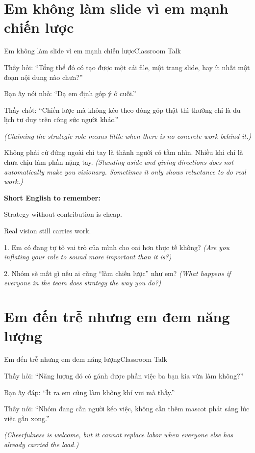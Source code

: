 \section{Em không làm slide vì em mạnh chiến lược}
\begin{truyen}{Em không làm slide vì em mạnh chiến lược}{Classroom Talk}

Thầy hỏi: ``Tổng thể đó có tạo được một cái file, một trang slide, hay ít nhất một đoạn nội dung nào chưa?''

Bạn ấy nói nhỏ: ``Dạ em định góp ý ở cuối.''

Thầy chốt: ``Chiến lược mà không kéo theo đóng góp thật thì thường chỉ là du lịch tư duy trên công sức người khác.''

\textit{(Claiming the strategic role means little when there is no concrete work behind it.)}
\end{truyen}

\begin{baihoc}
Không phải cứ đứng ngoài chỉ tay là thành người có tầm nhìn. Nhiều khi chỉ là chưa chịu làm phần nặng tay.
\textit{(Standing aside and giving directions does not automatically make you visionary. Sometimes it only shows reluctance to do real work.)}
\end{baihoc}

\begin{ghinhoanh}
\textbf{Short English to remember:}

Strategy without contribution is cheap.

Real vision still carries work.
\end{ghinhoanh}

\begin{tuhocnhanh}
1. Em có đang tự tô vai trò của mình cho oai hơn thực tế không? \textit{(Are you inflating your role to sound more important than it is?)}

2. Nhóm sẽ mất gì nếu ai cũng “làm chiến lược” như em? \textit{(What happens if everyone in the team does strategy the way you do?)}
\end{tuhocnhanh}
\ngancach

\section{Em đến trễ nhưng em đem năng lượng}
\begin{truyen}{Em đến trễ nhưng em đem năng lượng}{Classroom Talk}

Thầy hỏi: ``Năng lượng đó có gánh được phần việc ba bạn kia vừa làm không?''

Bạn ấy đáp: ``Ít ra em cũng làm không khí vui mà thầy.''

Thầy nói: ``Nhóm đang cần người kéo việc, không cần thêm mascot phát sáng lúc việc gần xong.''

\textit{(Cheerfulness is welcome, but it cannot replace labor when everyone else has already carried the load.)}
\end{truyen}

